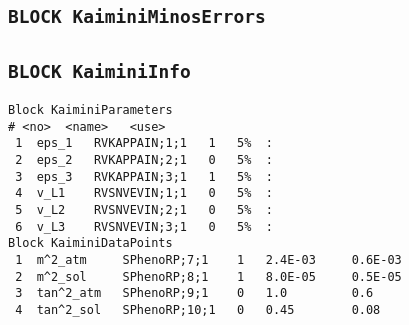 \documentclass[a4paper,12pt]{article}
\begin{document}
\subsection*{\tt{BLOCK KaiminiMinosErrors}}

\subsection*{\tt{BLOCK KaiminiInfo}}

\begin{Verbatim}[frame=single]
Block KaiminiParameters
# <no>  <name>   <use> 
 1  eps_1   RVKAPPAIN;1;1   1   5%  :
 2  eps_2   RVKAPPAIN;2;1   0   5%  :
 3  eps_3   RVKAPPAIN;3;1   1   5%  :
 4  v_L1    RVSNVEVIN;1;1   0   5%  :
 5  v_L2    RVSNVEVIN;2;1   0   5%  :
 6  v_L3    RVSNVEVIN;3;1   0   5%  :
Block KaiminiDataPoints
 1  m^2_atm     SPhenoRP;7;1    1   2.4E-03     0.6E-03
 2  m^2_sol     SPhenoRP;8;1    1   8.0E-05     0.5E-05
 3  tan^2_atm   SPhenoRP;9;1    0   1.0         0.6
 4  tan^2_sol   SPhenoRP;10;1   0   0.45        0.08
\end{Verbatim}
\end{document}

